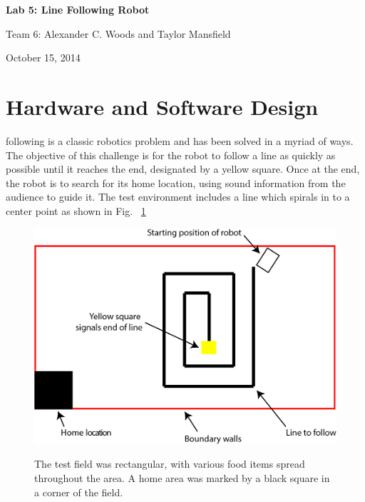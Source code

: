 \documentclass[journal]{IEEEtran}
\begin{document}
\begin{titlepage}
    \vspace*{\fill}
    \begin{center}
      {\LARGE \bf Lab 5: Line Following Robot}

      {Team 6: Alexander  C. Woods and Taylor Mansfield}

      October 15, 2014
    \end{center}
    \vspace*{\fill}
  \end{titlepage}


\section{Hardware and Software Design}\label{S.design}
 following is a classic robotics problem and has been solved in a myriad of ways. The objective of this challenge is for the robot to follow a line as quickly as possible until it reaches the end, designated by a yellow square. Once at the end, the robot is to search for its home location, using sound information from the audience to guide it. The test environment includes a line which spirals in to a center point as shown in Fig. ~\ref{F.field}



\begin{figure}[h]
 \centering
  \includegraphics[width=1\columnwidth]{field.jpg}\\
  \caption{The test field was rectangular, with various food items spread throughout the area. A home area was marked by a black square in a corner of the field.}
  \label{F.field}
\end{figure}
\end{document}
